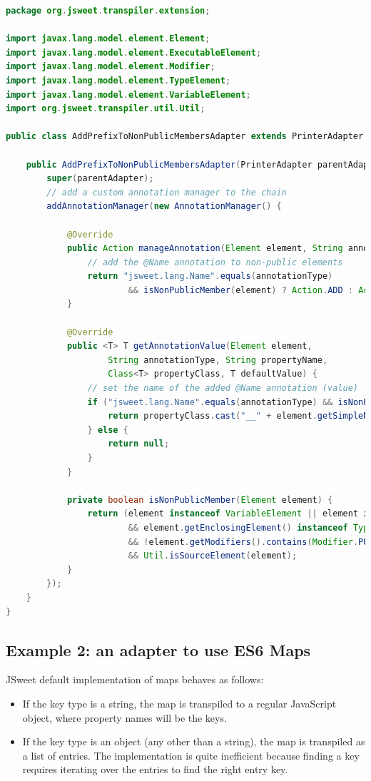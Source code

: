\documentclass[a4paper]{report}
\begin{document}
\begin{lstlisting}[language=Java]
package org.jsweet.transpiler.extension;

import javax.lang.model.element.Element;
import javax.lang.model.element.ExecutableElement;
import javax.lang.model.element.Modifier;
import javax.lang.model.element.TypeElement;
import javax.lang.model.element.VariableElement;
import org.jsweet.transpiler.util.Util;

public class AddPrefixToNonPublicMembersAdapter extends PrinterAdapter {

	public AddPrefixToNonPublicMembersAdapter(PrinterAdapter parentAdapter) {
		super(parentAdapter);
		// add a custom annotation manager to the chain
		addAnnotationManager(new AnnotationManager() {

			@Override
			public Action manageAnnotation(Element element, String annotationType) {
				// add the @Name annotation to non-public elements			
				return "jsweet.lang.Name".equals(annotationType) 
						&& isNonPublicMember(element) ? Action.ADD : Action.VOID;
			}

			@Override
			public <T> T getAnnotationValue(Element element, 
					String annotationType, String propertyName,
					Class<T> propertyClass, T defaultValue) {
				// set the name of the added @Name annotation (value)
				if ("jsweet.lang.Name".equals(annotationType) && isNonPublicMember(element)) {
					return propertyClass.cast("__" + element.getSimpleName());
				} else {
					return null;
				}
			}

			private boolean isNonPublicMember(Element element) {
				return (element instanceof VariableElement || element instanceof ExecutableElement)
						&& element.getEnclosingElement() instanceof TypeElement
						&& !element.getModifiers().contains(Modifier.PUBLIC) 
						&& Util.isSourceElement(element);
			}
		});
	}
}
\end{lstlisting}

\subsection{Example 2: an adapter to use ES6 Maps}

JSweet default implementation of maps behaves as follows:

\begin{itemize}
\item If the key type is a string, the map is transpiled to a regular JavaScript object, where property names will be the keys.
\item If the key type is an object (any other than a string), the map is transpiled as a list of entries.  The implementation is quite inefficient because finding a key requires iterating over the entries to find the right entry key.
\end{itemize}
\end{document}
